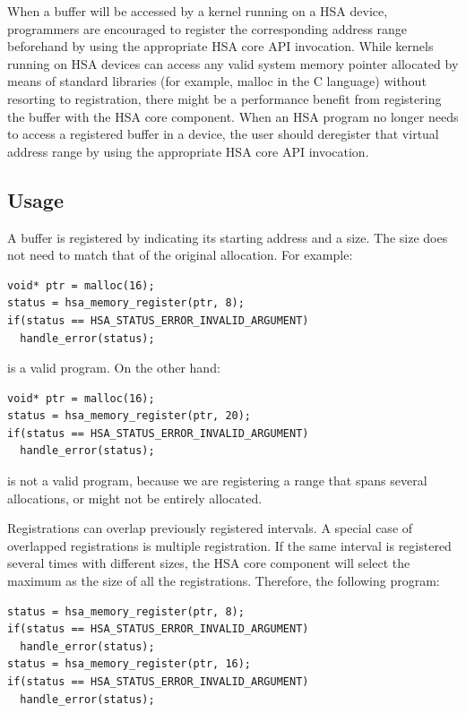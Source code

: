 \documentclass{book}
\begin{document}
When a buffer will be accessed by a kernel running on a HSA
device, programmers are encouraged to register the corresponding
address range beforehand by using the appropriate HSA core
API invocation. While kernels running on HSA devices can
access any valid system memory pointer allocated by means of
standard libraries (for example, malloc in the C language) without
resorting to registration, there might be a performance benefit from
registering the buffer with the HSA core component. When an
HSA program no longer needs to access a registered buffer in a
device, the user should deregister that virtual address range by
using the appropriate HSA core API invocation.



\hypertarget{coreapi_registration_usage}{}\subsection{Usage}\label{coreapi_registration_usage}

A buffer is registered by indicating its starting address and a
size. The size does not need to match that of the original
allocation. For example:

\begin{lstlisting}
void* ptr = malloc(16);
status = hsa_memory_register(ptr, 8);
if(status == HSA_STATUS_ERROR_INVALID_ARGUMENT)
  handle_error(status);
\end{lstlisting}

 is a valid program. On the other hand:

\begin{lstlisting}
void* ptr = malloc(16);
status = hsa_memory_register(ptr, 20);
if(status == HSA_STATUS_ERROR_INVALID_ARGUMENT)
  handle_error(status);
\end{lstlisting}

is not a valid program, because we are registering a range that
spans several allocations, or might not be entirely allocated.

Registrations can overlap previously registered intervals. A special
case of overlapped registrations is multiple registration. If the
same interval is registered several times with different sizes, the
HSA core component will select the maximum as the size of all
the registrations. Therefore, the following program:

\begin{lstlisting}
status = hsa_memory_register(ptr, 8);
if(status == HSA_STATUS_ERROR_INVALID_ARGUMENT)
  handle_error(status);
status = hsa_memory_register(ptr, 16);
if(status == HSA_STATUS_ERROR_INVALID_ARGUMENT)
  handle_error(status);
\end{lstlisting}
\end{document}
